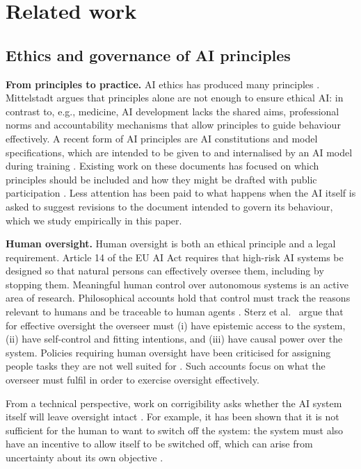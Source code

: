 \section{Related work}
\label{sec:related}

\subsection{Ethics and governance of AI principles}
\label{sec:related-ethics}

\textbf{From principles to practice.} AI ethics has produced many principles \citep{Jobin2019}. Mittelstadt \cite{Mittelstadt2019} argues that principles alone are not enough to ensure ethical AI: in contrast to, e.g., medicine, AI development lacks the shared aims, professional norms and accountability mechanisms that allow principles to guide behaviour effectively. A recent form of AI principles are AI constitutions and model specifications, which are intended to be given to and internalised by an AI model during training \citep{bai2022constitutional,Anthropic2026,OpenAI2025}. Existing work on these documents has focused on which principles should be included \citep{kundu2023specific} and how they might be drafted with public participation \citep{huang2024collective}. Less attention has been paid to what happens when the AI itself is asked to suggest revisions to the document intended to govern its behaviour, which we study empirically in this paper.

\textbf{Human oversight.} Human oversight is both an ethical principle \citep{HLEG2019} and a legal requirement. Article 14 of the EU AI Act \cite{EUAIAct2024} requires that high-risk AI systems be designed so that natural persons can effectively oversee them, including by stopping them. Meaningful human control over autonomous systems is an active area of research. Philosophical accounts hold that control must track the reasons relevant to humans and be traceable to human agents \citep{SantoniDeSio2018}. Sterz et al.\ \cite{Sterz2024} argue that for effective oversight the overseer must (i) have epistemic access to the system, (ii) have self-control and fitting intentions, and (iii) have causal power over the system. Policies requiring human oversight have been criticised for assigning people tasks they are not well suited for \citep{Green2022}. Such accounts focus on what the overseer must fulfil in order to exercise oversight effectively.

From a technical perspective, work on corrigibility asks whether the AI system itself will leave oversight intact \citep{soares2015corrigibility}. For example, it has been shown that it is not sufficient for the human to want to switch off the system: the system must also have an incentive to allow itself to be switched off, which can arise from uncertainty about its own objective \citep{HadfieldMenell2017}.

